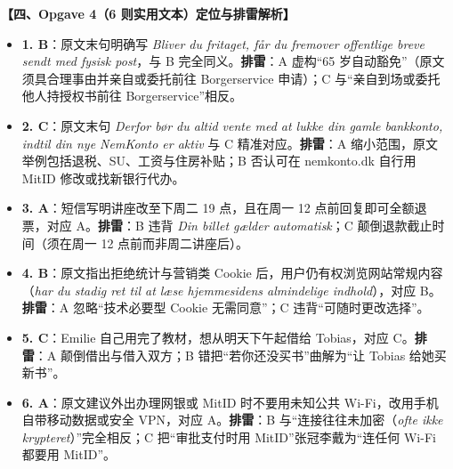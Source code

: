 \begin{answerbox}
\textbf{\color{NCDNavy}【四、Opgave 4（6 则实用文本）定位与排雷解析】}
\begin{itemize}
  \item \textbf{1. B}：原文末句明确写 \textit{Bliver du fritaget, får du fremover offentlige breve sendt med fysisk post}，与 B 完全同义。\textbf{排雷}：A 虚构“65 岁自动豁免”（原文须具合理事由并亲自或委托前往 Borgerservice 申请）；C 与“亲自到场或委托他人持授权书前往 Borgerservice”相反。
  \item \textbf{2. C}：原文末句 \textit{Derfor bør du altid vente med at lukke din gamle bankkonto, indtil din nye NemKonto er aktiv} 与 C 精准对应。\textbf{排雷}：A 缩小范围，原文举例包括退税、SU、工资与住房补贴；B 否认可在 nemkonto.dk 自行用 MitID 修改或找新银行代办。
  \item \textbf{3. A}：短信写明讲座改至下周二 19 点，且在周一 12 点前回复即可全额退票，对应 A。\textbf{排雷}：B 违背 \textit{Din billet gælder automatisk}；C 颠倒退款截止时间（须在周一 12 点前而非周二讲座后）。
  \item \textbf{4. B}：原文指出拒绝统计与营销类 Cookie 后，用户仍有权浏览网站常规内容（\textit{har du stadig ret til at læse hjemmesidens almindelige indhold}），对应 B。\textbf{排雷}：A 忽略“技术必要型 Cookie 无需同意”；C 违背“可随时更改选择”。
  \item \textbf{5. C}：Emilie 自己用完了教材，想从明天下午起借给 Tobias，对应 C。\textbf{排雷}：A 颠倒借出与借入双方；B 错把“若你还没买书”曲解为“让 Tobias 给她买新书”。
  \item \textbf{6. A}：原文建议外出办理网银或 MitID 时不要用未知公共 Wi-Fi，改用手机自带移动数据或安全 VPN，对应 A。\textbf{排雷}：B 与“连接往往未加密（\textit{ofte ikke krypteret}）”完全相反；C 把“审批支付时用 MitID”张冠李戴为“连任何 Wi-Fi 都要用 MitID”。
\end{itemize}
\end{answerbox}

